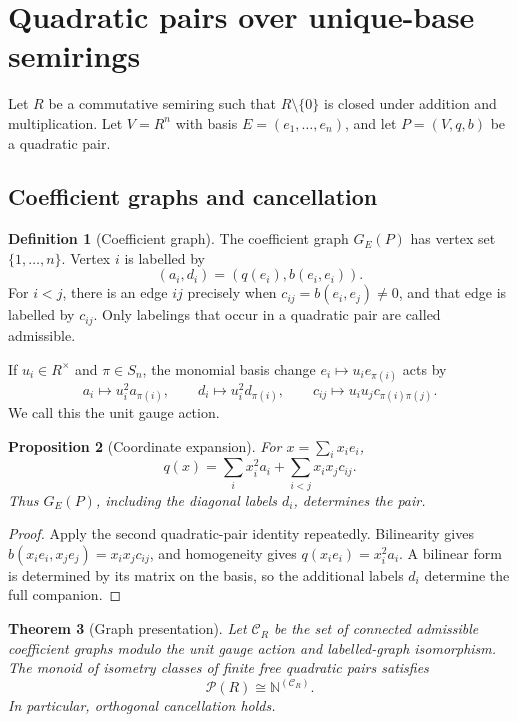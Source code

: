 \documentclass[11pt]{article}
\newtheorem{theorem}{Theorem}[section]
\newtheorem{proposition}[theorem]{Proposition}
\theoremstyle{definition}
\newtheorem{definition}[theorem]{Definition}
\theoremstyle{remark}
\newcommand{\Nat}{\mathbb N}
\newcommand{\Pair}{\mathcal P}
\newcommand{\Connected}{\mathcal C}
\begin{document}
\section{Quadratic pairs over unique-base semirings}\label{sec:graphs}

Let \(R\) be a commutative semiring such that \(R\setminus\{0\}\) is closed
under addition and multiplication.  Let \(V=R^n\) with basis
\(E=(e_1,\ldots,e_n)\), and let \(P=(V,q,b)\) be a quadratic pair.

\subsection{Coefficient graphs and cancellation}

\begin{definition}[Coefficient graph]\label{def:graph}
The coefficient graph \(G_E(P)\) has vertex set \(\{1,\ldots,n\}\).  Vertex
\(i\) is labelled by
\[
 (a_i,d_i)=(q(e_i),b(e_i,e_i)).
\]
For \(i<j\), there is an edge \(ij\) precisely when
\(c_{ij}=b(e_i,e_j)\ne0\), and that edge is labelled by \(c_{ij}\).
Only labelings that occur in a quadratic pair are called admissible.
\end{definition}

If \(u_i\in R^\times\) and \(\pi\in S_n\), the monomial basis change
\(e_i\mapsto u_i e_{\pi(i)}\) acts by
\[
 a_i\mapsto u_i^2a_{\pi(i)},\qquad
 d_i\mapsto u_i^2d_{\pi(i)},\qquad
 c_{ij}\mapsto u_iu_jc_{\pi(i)\pi(j)}.
\]
We call this the unit gauge action.

\begin{proposition}[Coordinate expansion]\label{prop:expansion}
For \(x=\sum_i x_ie_i\),
\[
 q(x)=\sum_i x_i^2a_i+\sum_{i<j}x_ix_jc_{ij}.
\]
Thus \(G_E(P)\), including the diagonal labels \(d_i\), determines the pair.
\end{proposition}

\begin{proof}
Apply the second quadratic-pair identity repeatedly.  Bilinearity gives
\(b(x_ie_i,x_je_j)=x_ix_jc_{ij}\), and homogeneity gives
\(q(x_ie_i)=x_i^2a_i\).  A bilinear form is determined by its matrix on the
basis, so the additional labels \(d_i\) determine the full companion.
\end{proof}

\begin{theorem}[Graph presentation]\label{thm:graph}
Let \(\Connected_R\) be the set of connected admissible coefficient graphs
modulo the unit gauge action and labelled-graph isomorphism.  The monoid of
isometry classes of finite free quadratic pairs satisfies
\[
 \Pair(R)\cong\Nat^{(\Connected_R)}.
\]
In particular, orthogonal cancellation holds.
\end{theorem}
\end{document}
